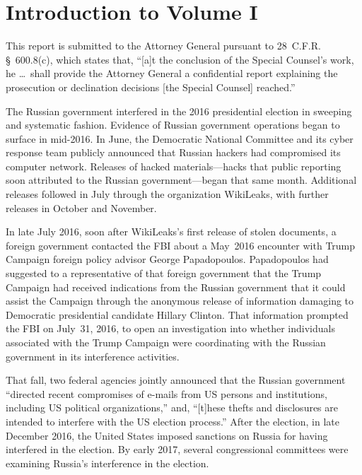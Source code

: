 \section*{Introduction to Volume I}
\label{sec:introduction-1}

This report is submitted to the Attorney General pursuant to 28~C.F.R. \S~600.8(c), which states that, ``[a]t the conclusion of the Special Counsel's work, he \dots\ shall provide the Attorney General a confidential report explaining the prosecution or declination decisions [the Special Counsel] reached.''

The Russian government interfered in the 2016 presidential election in sweeping and systematic fashion.
Evidence of Russian government operations began to surface in mid-2016.
In June, the Democratic National Committee and its cyber response team publicly announced that Russian hackers had compromised its computer network. Releases of hacked materials---hacks that public reporting soon attributed to the Russian government---began that same month.
Additional releases followed in July through the organization WikiLeaks, with further releases in October and November.

In late July 2016, soon after WikiLeaks's first release of stolen documents, a foreign government contacted the FBI about a May~2016 encounter with Trump Campaign foreign policy advisor George Papadopoulos.
Papadopoulos had suggested to a representative of that foreign government that the Trump Campaign had received indications from the Russian government that it could assist the Campaign through the anonymous release of information damaging to Democratic presidential candidate Hillary Clinton.
That information prompted the FBI on July~31, 2016, to open an investigation into whether individuals associated with the Trump Campaign were coordinating with the Russian government in its interference activities.

That fall, two federal agencies jointly announced that the Russian government ``directed recent compromises of e-mails from US persons and institutions, including US political organizations,'' and, ``[t]hese thefts and disclosures are intended to interfere with the US election process.''
After the election, in late December 2016, the United States imposed sanctions on Russia for having interfered in the election. By early 2017, several congressional committees were examining Russia's interference in the election.


